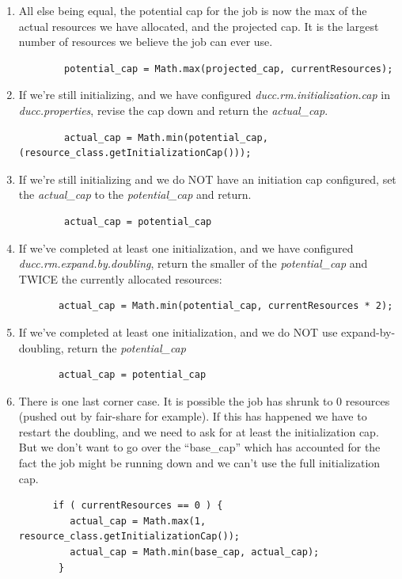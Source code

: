 \begin{enumerate}
        \item All else being equal, the potential cap for the job is now the max of the actual
          resources we have allocated, and the projected cap.  It is the largest number of
          resources we believe the job can ever use.
\begin{verbatim}
        potential_cap = Math.max(projected_cap, currentResources);
\end{verbatim}

            \item If we're still initializing, and we have configured {\em ducc.rm.initialization.cap}
              in {\em ducc.properties}, revise the cap down and return the {\em actual\_cap}.
\begin{verbatim}
        actual_cap = Math.min(potential_cap, (resource_class.getInitializationCap()));
\end{verbatim}

            \item If we're still initializing and we do NOT have an initiation cap configured,
              set the {\em actual\_cap} to the {\em potential\_cap} and return.
\begin{verbatim}
        actual_cap = potential_cap
\end{verbatim}
              
            \item If we've completed at least one initialization, and we have configured
              {\em ducc.rm.expand.by.doubling}, return the smaller of the {\em potential\_cap}
              and TWICE the currently allocated resources:
\begin{verbatim}
       actual_cap = Math.min(potential_cap, currentResources * 2);
\end{verbatim}

            \item If we've completed at least one initialization, and we do NOT use
              expand-by-doubling, return the {\em potential\_cap}
\begin{verbatim}
       actual_cap = potential_cap
\end{verbatim}

              \item There is one last corner case.  It is possible the job has
                shrunk to 0 resources (pushed out by fair-share for example). If
                this has happened we have to restart the doubling, and we need to
                ask for at least the initialization cap.  But we don't want to go
                over the ``base\_cap'' which has accounted for the fact the job might
                be running down and we can't use the full initialization cap.
\begin{verbatim}
      if ( currentResources == 0 ) {
         actual_cap = Math.max(1, resource_class.getInitializationCap()); 
         actual_cap = Math.min(base_cap, actual_cap);                     
       }
\end{verbatim}


        \end{enumerate}
    
